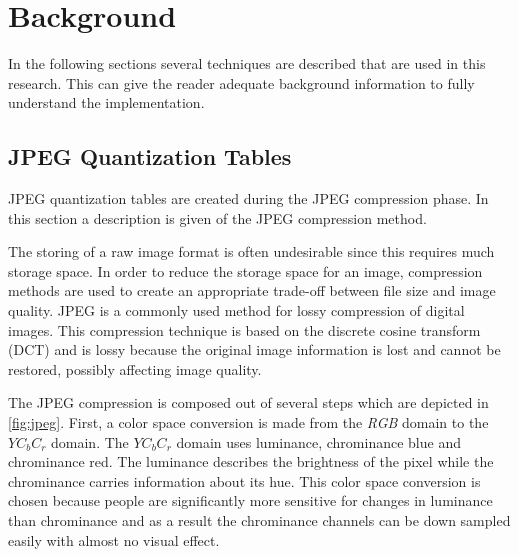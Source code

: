 
\chapter{Background} %

\label{ch:background} %

In the following sections several techniques are described that are used in this research. This can give the reader adequate background information to fully understand the implementation.


\section{JPEG Quantization Tables}\label{sec:dqt}
JPEG quantization tables are created during the JPEG compression phase. In this section a description is given of the JPEG compression method.

The storing of a raw image format is often undesirable since this requires much storage space. In order to reduce the storage space for an image, compression methods are used to create an appropriate trade-off between file size and image quality. JPEG is a commonly used method for lossy compression of digital images. This compression technique is based on the discrete cosine transform (DCT) and is lossy because the original image information is lost and cannot be restored, possibly affecting image quality. 

The JPEG compression is composed out of several steps which are depicted in \autoref{fig:jpeg}. First, a color space conversion is made from the \textit{RGB} domain to the $YC_bC_r$  domain. The $YC_bC_r$ domain uses luminance, chrominance blue and chrominance red. The luminance describes the brightness of the pixel while the chrominance carries information about its hue. This color space conversion is chosen because people are significantly more sensitive for changes in luminance than chrominance and as a result the chrominance channels can be down sampled easily with almost no visual effect. 

